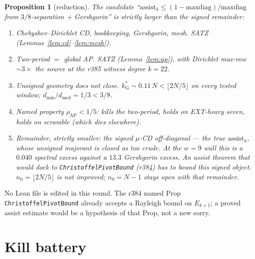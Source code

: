\documentclass[11pt]{article}
\newtheorem{prop}{Proposition}
\theoremstyle{remark}
\begin{document}
\begin{prop}[reduction]\label{prop:red}
The candidate ``$\mathrm{assist}_k\le(1-\mathrm{maxdiag})/\mathrm{maxdiag}$
from $3/8$-separation + Gershgorin'' is strictly larger than the
signed remainder:
\begin{enumerate}
\item \emph{Chebyshev--Dirichlet CD, bookkeeping, Gershgorin, mesh.}
  SATZ (Lemmas~\ref{lem:cd}--\ref{lem:mesh}).
\item \emph{Two-period $=$ global AP.}  SATZ
  (Lemma~\ref{lem:ap}), with Dirichlet max-row $\sim 3\times$ the
  source at the r385 witness degree $k=22$.
\item \emph{Unsigned geometry does not close.}
  $k^*_{\mathrm{G}}\sim 0.11\,N<\lfloor 2N/5\rfloor$ on every
  tested window; $d_{\min}/d_{\mathrm{med}}=1/3<3/8$.
\item \emph{Named property} $\rho_{\mathrm{AP}}<1/5$: kills the
  two-period, holds on EXT-heavy seven, holds on scramble
  (which dies elsewhere).
\item \emph{Remainder, strictly smaller:} the signed
  $\mu$-CD off-diagonal --- the true $\mathrm{assist}_k$, whose
  unsigned majorant is closed as too crude.  At the $w=9$ wall
  this is a $0.040$ spectral excess against a $13.3$ Gershgorin
  excess.  An assist theorem that would dock to
  \texttt{ChristoffelPivotBound} (r384) has to bound this
  \emph{signed} object.  $n_0=\lfloor 2N/5\rfloor$ is not
  improved; $n_0=N-1$ stays open with that remainder.
\end{enumerate}
\end{prop}

No Lean file is edited in this round.  The r384 named Prop
\texttt{ChristoffelPivotBound} already accepts a Rayleigh bound
on $E_{k+1}$; a proved assist estimate would be a hypothesis
of that Prop, not a new sorry.

\section{Kill battery}\label{sec:kill}
\end{document}
